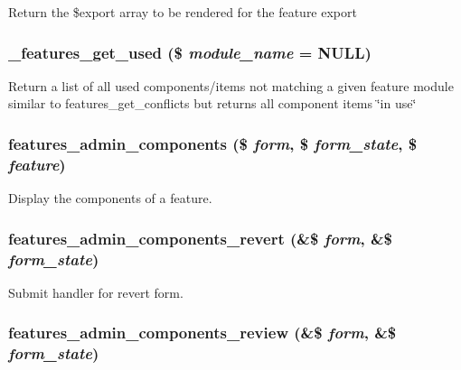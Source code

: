 \label{features_8admin_8inc_aa105fdb0198373e24dfbe6ae4d096412}
Return the \$export array to be rendered for the feature export \hypertarget{features_8admin_8inc_a76b8c6e5b86aa11400cc20a7d7e46f38}{
\subsubsection[{\_\-features\_\-get\_\-used}]{\setlength{\rightskip}{0pt plus 5cm}\_\-features\_\-get\_\-used (\$ {\em module\_\-name} = {\ttfamily NULL})}}
\label{features_8admin_8inc_a76b8c6e5b86aa11400cc20a7d7e46f38}
Return a list of all used components/items not matching a given feature module similar to features\_\-get\_\-conflicts but returns all component items \char`\"{}in use\char`\"{} \hypertarget{features_8admin_8inc_a067c23732eead05d84bf72fe3aec700e}{
\subsubsection[{features\_\-admin\_\-components}]{\setlength{\rightskip}{0pt plus 5cm}features\_\-admin\_\-components (\$ {\em form}, \/  \$ {\em form\_\-state}, \/  \$ {\em feature})}}
\label{features_8admin_8inc_a067c23732eead05d84bf72fe3aec700e}
Display the components of a feature. \hypertarget{features_8admin_8inc_a7f63d61d90f74c8c0f61436393ab408a}{
\subsubsection[{features\_\-admin\_\-components\_\-revert}]{\setlength{\rightskip}{0pt plus 5cm}features\_\-admin\_\-components\_\-revert (\&\$ {\em form}, \/  \&\$ {\em form\_\-state})}}
\label{features_8admin_8inc_a7f63d61d90f74c8c0f61436393ab408a}
Submit handler for revert form. \hypertarget{features_8admin_8inc_a679e838f6eeba57c2be406f1ea6fae25}{
\subsubsection[{features\_\-admin\_\-components\_\-review}]{\setlength{\rightskip}{0pt plus 5cm}features\_\-admin\_\-components\_\-review (\&\$ {\em form}, \/  \&\$ {\em form\_\-state})}}
